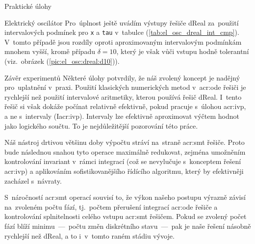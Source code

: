 \documentclass[thesis=M,czech]{FITthesis}[2012/06/26]
\newcommand{\acrlabel}[1]{acr:#1}
\newcommand{\acr}[1]{\acrshort{\acrlabel{#1}}}
\newcommand{\id}[1]{\texttt{#1}}
\newcommand{\rf}[1]{\ref{#1}}
\newcommand{\picL}{pic}
\newcommand{\rfPic}[1]{(\rf{\picL:#1})}
\newcommand{\tabL}{tab}
\newcommand{\rfTab}[1]{(\rf{\tabL:#1})}
\begin{document}
\begin{section}{Praktické úlohy}
\begin{subsection}{Elektrický oscilátor}
Pro~úplnost ještě uvádím výstupy řešiče dReal
za~použití intervalových podmínek pro \id{x} a \id{tau}
v~tabulce \rfTab{el_osc_dreal_int_cmp}.
V~tomto případě jsou rozdíly
oproti aproximovaným intervalovým podmínkám
mnohem vyšší, kromě případu ${\delta = 10}$,
který je však vůči vstupu hodně tolerantní
(viz.~obrázek \rfPic{el_osc:dreal:d10}).
\end{subsection} %


\begin{subsection}{Závěr experimentů}\label{ss:exp:examples:conclusion}
Některé úlohy potvrdily, že náš zvolený koncept
je nadějný pro~uplatnění v~praxi.
Použití klasických numerických metod v~\acr{ode} řešiči
je rychlejší než použití intervalové aritmetiky,
kterou používá řešič dReal.
I~tento řešič si však dokáže počínat relativně efektivně,
pokud pracuje s~úlohou \acr{ivp},
a ne s~intervaly (I\acr{ivp}).
Intervaly lze efektivně aproximovat výčtem hodnot
jako logického součtu.
To je nejdůležitější pozorování této práce.

Náš nástroj drtivou většinu doby výpočtu stráví
na~straně \acr{smt} řešiče.
Proto bude následnou snahou
tyto operace maximálně redukovat,
zejména umožněním kontrolování invariant v~rámci integrací
(což se nevylučuje s~konceptem řešení \acr{ivp})
a aplikováním sofistikovanějšího
řídícího algoritmu, který by efektivněji zacházel s~návraty.

S~náročností \acr{smt} operací souvisí to,
že výkon našeho postupu výrazně závisí
na~zvoleném počtu fází,
tj.~počtem přerušení integrací \acr{ode} řešiče
a kontrolování splnitelnosti celého vstupu \acr{smt} řešičem.
Pokud se zvolený počet fází blíží
minimu~---~počtu změn diskrétního
stavu~---~pak je naše řešení násobně rychlejší než dReal,
a to i~v~tomto raném stádiu vývoje.
\end{subsection} %


\end{section} %

\end{document}
